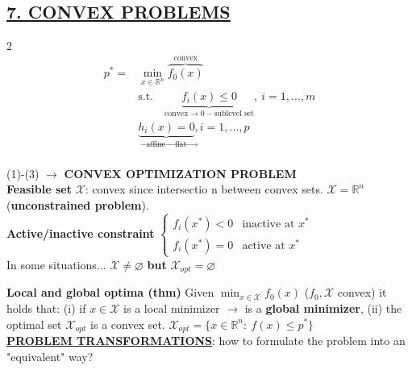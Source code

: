 \documentclass[a4paper]{article}
\begin{document}
\subsection*{\color{cyan}
\textsf{\underline{7. CONVEX PROBLEMS}}}
\vspace{-0.5cm}
\begin{multicols}{2}
    \begin{align}
        p^*=&\min_{x\in\mathbb{R}^n} \overbrace{f_0(x)}^{\text{convex}}\\
         &\text{s.t.} \quad \underbrace{f_i(x)\le0}_{\text{convex}\to 0-\text{sublevel set}}, \  i=1,..., m\\
         &\underbrace{h_i(x)=0}_{\text{affine}\to\ \text{flat}},  i=1,...,p
    \end{align}\\
    (1)-(3) $\to$ \textbf{CONVEX OPTIMIZATION PROBLEM}\\

    \noindent
    \textbf{Feasible set} $\mathcal{X}$: convex since intersectio n between convex sets. $\mathcal{X}=\mathbb{R}^n$ (\textbf{unconstrained problem}).\\
    \textbf{Active/inactive constraint} $\begin{cases}
        f_i(x^*)<0&\text{inactive at $x^*$}\\
        f_i(x^*)=0&\text{active at $x^*$}    
    \end{cases}$\\
    In some situations...
    $\mathcal{X}\ne\varnothing$ \textbf{but} $\mathcal{X}_{opt}=\varnothing$  
\end{multicols}
\noindent
\textbf{Local and global optima (thm)} Given $\min_{x\in\mathcal{X}}{f_0(x)}$ ($f_0, \mathcal{X}$ convex) it holds that: (i) if $x\in\mathcal{X}$ is a local minimizer $\to$ is a \textbf{global minimizer}, (ii) the optimal set $\mathcal{X}_{opt}$ is a convex set. \quad
$\mathcal{X}_{opt}=\{x\in\mathbb{R}^n: \ f(x)\le{p}^*\}$\\
\textbf{\underline{PROBLEM TRANSFORMATIONS}}: how to formulate the problem into an "equivalent" way?\\
\end{document}
